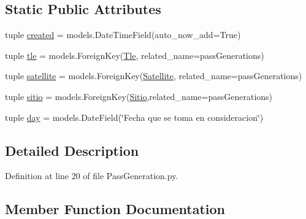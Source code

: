 \subsection*{Static Public Attributes}
\begin{DoxyCompactItemize}
\item 
tuple \hyperlink{class_ground_segment_1_1models_1_1_pass_generation_1_1_pass_generation_a996c25b5465779183f0e8876416efd1c}{created} = models.\+Date\+Time\+Field(auto\+\_\+now\+\_\+add=True)
\item 
tuple \hyperlink{class_ground_segment_1_1models_1_1_pass_generation_1_1_pass_generation_a71db0ead15e88702108257298c413ffe}{tle} = models.\+Foreign\+Key(\hyperlink{class_ground_segment_1_1models_1_1_tle_1_1_tle}{Tle}, related\+\_\+name=\textquotesingle{}pass\+Generations\textquotesingle{})
\item 
tuple \hyperlink{class_ground_segment_1_1models_1_1_pass_generation_1_1_pass_generation_a0f1c573d07a1127b70c0e4b3085e0149}{satellite} = models.\+Foreign\+Key(\hyperlink{class_ground_segment_1_1models_1_1_satellite_1_1_satellite}{Satellite}, related\+\_\+name=\textquotesingle{}pass\+Generations\textquotesingle{})
\item 
tuple \hyperlink{class_ground_segment_1_1models_1_1_pass_generation_1_1_pass_generation_a3917c0e67d8a74db52404c6696d2e1c8}{sitio} = models.\+Foreign\+Key(\hyperlink{class_ground_segment_1_1models_1_1_sitio_1_1_sitio}{Sitio},related\+\_\+name=\textquotesingle{}pass\+Generations\textquotesingle{})
\item 
tuple \hyperlink{class_ground_segment_1_1models_1_1_pass_generation_1_1_pass_generation_a0468102949615d7326a6b3c3a270994f}{day} = models.\+Date\+Field(\char`\"{}Fecha que se toma en consideracion\char`\"{})
\end{DoxyCompactItemize}


\subsection{Detailed Description}


Definition at line 20 of file Pass\+Generation.\+py.



\subsection{Member Function Documentation}
\hypertarget{class_ground_segment_1_1models_1_1_pass_generation_1_1_pass_generation_a07354412d0bbfed5b5793458b6b42faf}{}
